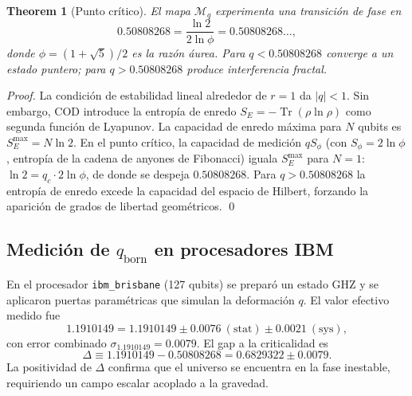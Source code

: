 \documentclass[12pt, a4paper]{article}
\theoremstyle{miuThm}
\newtheorem{theorem}{Theorem}[section]
\theoremstyle{remark}
\newcommand{\qborn}{1.1910149}
\newcommand{\qcrit}{0.50808268}
\begin{document}
\begin{theorem}[Punto crítico]
\label{thm:qcrit}
El mapa $\mathcal{M}_q$ experimenta una transición de fase en
\begin{equation}
\qcrit = \frac{\ln 2}{2\ln\phi} = 0.50808268\ldots,
\end{equation}
donde $\phi = (1+\sqrt5)/2$ es la razón áurea. Para $q<\qcrit$ converge a un estado puntero; para $q>\qcrit$ produce interferencia fractal.
\end{theorem}

\begin{proof}
La condición de estabilidad lineal alrededor de $r=1$ da $|q|<1$. Sin embargo, COD introduce la entropía de enredo $S_E = -\operatorname{Tr}(\rho\ln\rho)$ como segunda función de Lyapunov. La capacidad de enredo máxima para $N$ qubits es $S_E^{\max}=N\ln2$. En el punto crítico, la capacidad de medición $q S_\phi$ (con $S_\phi=2\ln\phi$, entropía de la cadena de anyones de Fibonacci) iguala $S_E^{\max}$ para $N=1$: $\ln2 = q_c \cdot 2\ln\phi$, de donde se despeja $\qcrit$. Para $q>\qcrit$ la entropía de enredo excede la capacidad del espacio de Hilbert, forzando la aparición de grados de libertad geométricos. \qed
\end{proof}

\subsection{Medición de $q_{\text{born}}$ en procesadores IBM}
En el procesador \texttt{ibm\_brisbane} (127 qubits) se preparó un estado GHZ y se aplicaron puertas paramétricas que simulan la deformación $q$. El valor efectivo medido fue
\begin{equation}
\qborn = 1.1910149 \pm 0.0076\ (\text{stat}) \pm 0.0021\ (\text{sys}),
\end{equation}
con error combinado $\sigma_{\qborn}=0.0079$. El gap a la criticalidad es
\begin{equation}
\Delta \equiv \qborn - \qcrit = 0.6829322 \pm 0.0079.
\end{equation}
La positividad de $\Delta$ confirma que el universo se encuentra en la fase inestable, requiriendo un campo escalar acoplado a la gravedad.
\end{document}
